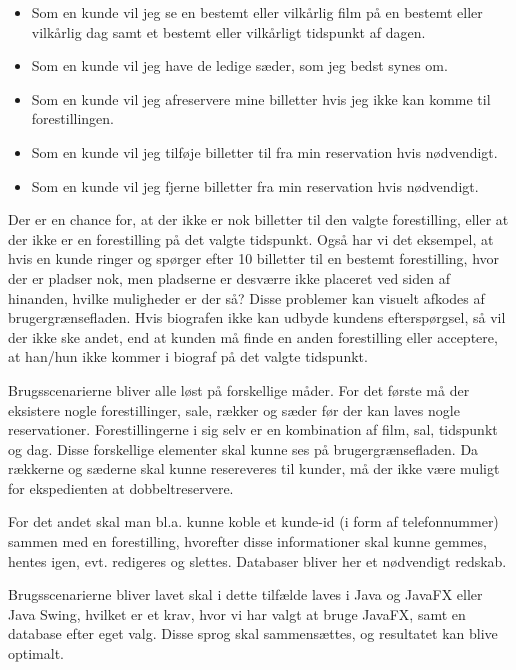 \begin{itemize}
  \item Som en kunde vil jeg se en bestemt eller vilkårlig film på en bestemt eller vilkårlig dag samt et bestemt eller vilkårligt tidspunkt af dagen.
  \item Som en kunde vil jeg have de ledige sæder, som jeg bedst synes om.
  \item Som en kunde vil jeg afreservere mine billetter hvis jeg ikke kan komme til forestillingen.
  \item Som en kunde vil jeg tilføje billetter til fra min reservation hvis nødvendigt.
  \item Som en kunde vil jeg fjerne billetter fra min reservation hvis nødvendigt.
\end{itemize}

Der er en chance for, at der ikke er nok billetter til den valgte forestilling, eller at der ikke er en forestilling på det valgte tidspunkt. Også har vi det eksempel, at hvis en kunde ringer og spørger efter 10 billetter til en bestemt forestilling, hvor der er pladser nok, men pladserne er desværre ikke placeret ved siden af hinanden, hvilke muligheder er der så? Disse problemer kan visuelt afkodes af brugergrænsefladen. Hvis biografen ikke kan udbyde kundens efterspørgsel, så vil der ikke ske andet, end at kunden må finde en anden forestilling eller acceptere, at han/hun ikke kommer i biograf på det valgte tidspunkt.

Brugsscenarierne bliver alle løst på forskellige måder. For det første må der eksistere nogle forestillinger, sale, rækker og sæder før der kan laves nogle reservationer. Forestillingerne i sig selv er en kombination af film, sal, tidspunkt og dag. Disse forskellige elementer skal kunne ses på brugergrænsefladen. Da rækkerne og sæderne skal kunne resereveres til kunder, må der ikke være muligt for ekspedienten at dobbeltreservere.

For det andet skal man bl.a. kunne koble et kunde-id (i form af telefonnummer) sammen med en forestilling, hvorefter disse informationer skal kunne gemmes, hentes igen, evt. redigeres og slettes. Databaser bliver her et nødvendigt redskab.

Brugsscenarierne bliver lavet %
skal i dette tilfælde laves i Java og JavaFX eller Java Swing, hvilket er et krav, hvor vi har valgt at bruge JavaFX, samt en database efter eget valg. Disse sprog skal sammensættes, og resultatet kan blive optimalt.

